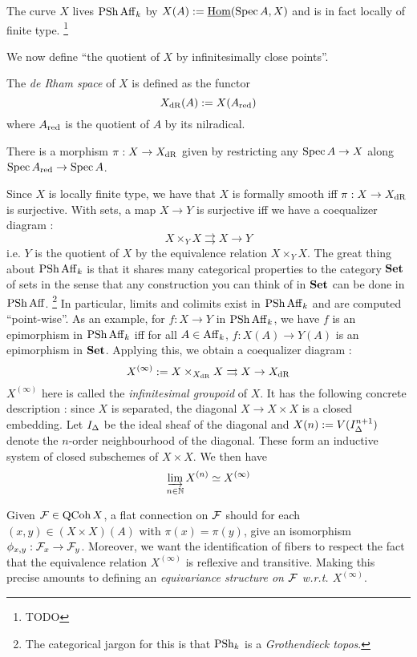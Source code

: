 \documentclass[./main.tex]{subfiles}
\begin{document}
The curve $X$ lives $\operatorname{PSh} \mathrm{Aff}_k$ by
$X(A) := \underline{\mathrm{Hom}}(\operatorname{Spec} A , X)$
and is in fact locally of finite type.
\footnote{TODO}

We now define ``the quotient of $X$ by infinitesimally close points''.
\begin{dfn}
  The \emph{de Rham space} of $X$ is defined as the functor 
  \[
    X_{\mathrm{dR}}(A) := X(A_{\mathrm{red}})
  \]
  where $A_{\mathrm{red}}$ is the quotient of $A$ by its nilradical.

  There is a morphism $\pi : X \to X_{\mathrm{dR}}$ given by
  restricting any $\operatorname{Spec} A \to X$ along $\operatorname{Spec} A_{\mathrm{red}} \to \operatorname{Spec} A$.
\end{dfn}

Since $X$ is locally finite type,
we have that $X$ is formally smooth iff $\pi : X \to X_{\mathrm{dR}}$ is surjective.
With sets,
a map $X \to Y$ is surjective iff we have a coequalizer diagram : 
\[
  X \times_Y X \rightrightarrows X \to Y
\]
i.e. $Y$ is the quotient of $X$ by the equivalence relation $X \times_Y X$.
The great thing about $\operatorname{PSh} \mathrm{Aff}_k$ is that
it shares many categorical properties
to the category $\mathbf{Set}$ of sets in the sense that 
any construction you can think of in $\mathbf{Set}$ can be done in $\operatorname{PSh} \mathrm{Aff}$.
\footnote{The categorical jargon for this is that $\operatorname{PSh}_k$ is a 
\emph{Grothendieck topos}.}
In particular, 
limits and colimits exist in $\operatorname{PSh} \mathrm{Aff}_k$ and
are computed ``point-wise''.
As an example, for $f : X \to Y$ in $\operatorname{PSh} \mathrm{Aff}_k$,
we have $f$ is an epimorphism in $\operatorname{PSh} \mathrm{Aff}_k$ iff
for all $A \in \mathrm{Aff}_k$, $f : X(A) \to Y(A)$ is an epimorphism in $\mathbf{Set}$.
Applying this, we obtain a coequalizer diagram : 
\[
  X^{(\infty)} := X \times_{X_{\mathrm{dR}}} X \rightrightarrows X \to X_{\mathrm{dR}}
\]
$X^{(\infty)}$ here is called the \emph{infinitesimal groupoid} of $X$.
It has the following concrete description : 
since $X$ is separated, the diagonal $X \to X \times X$ is a closed embedding.
Let $I_\Delta$ be the ideal sheaf of the diagonal
and $X(n) := V(I_\Delta^{n+1})$ denote the $n$-order neighbourhood of
the diagonal.
These form an inductive system of closed subschemes of $X \times X$.
We then have \[
  \varinjlim_{n \in \mathbb{N}} X^{(n)} \simeq X^{(\infty)}
\]

Given $\mathcal{F} \in \operatorname{QCoh} X$,
a flat connection on $\mathcal{F}$ should for each $(x,y) \in (X \times X)(A)$
with $\pi(x) = \pi(y)$, give an isomorphism $\phi_{x,y} : \mathcal{F}_x \to \mathcal{F}_y$.
Moreover, we want the identification of fibers to
respect the fact that the equivalence relation $X^{(\infty)}$
is reflexive and transitive.
Making this precise amounts to defining
an \emph{equivariance structure on $\mathcal{F}$ w.r.t. $X^{(\infty)}$}.
\end{document}
